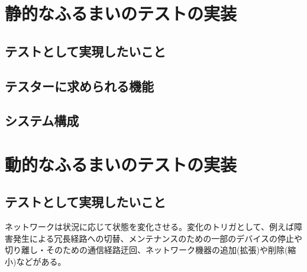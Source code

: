 
 \section{静的なふるまいのテストの実装}

  \subsection{テストとして実現したいこと}
  \subsection{テスターに求められる機能}
  \subsection{システム構成}

 \section{動的なふるまいのテストの実装}

  \subsection{テストとして実現したいこと}
ネットワークは状況に応じて状態を変化させる。変化のトリガとして、例えば障
害発生による冗長経路への切替、メンテナンスのための一部のデバイスの停止や
切り離し・そのための通信経路迂回、ネットワーク機器の追加(拡張)や削除(縮
小)などがある。

